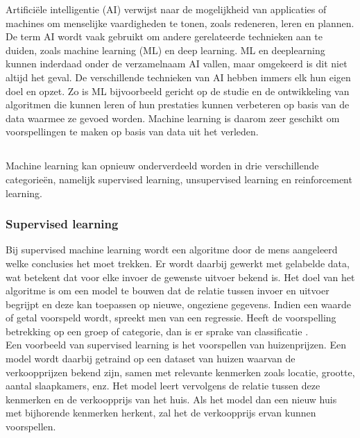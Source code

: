 Artificiële intelligentie (AI) verwijst naar de mogelijkheid van applicaties of machines om menselijke vaardigheden te tonen, zoals redeneren, leren en plannen. De term AI wordt vaak gebruikt om andere gerelateerde technieken aan te duiden, zoals machine learning (ML) en deep learning. ML en deeplearning kunnen inderdaad onder de verzamelnaam AI vallen, maar omgekeerd is dit niet altijd het geval. De verschillende technieken van AI hebben immers elk hun eigen doel en opzet. Zo is ML bijvoorbeeld gericht op de studie en de ontwikkeling van algoritmen die kunnen leren of hun prestaties kunnen verbeteren op basis van de data waarmee ze gevoed worden. Machine learning is daarom zeer geschikt om voorspellingen te maken op basis van data uit het verleden. \\

\subsection{}%
\label{sec:machine learning}

Machine learning kan opnieuw onderverdeeld worden in drie verschillende categorieën, namelijk supervised learning, unsupervised learning en reinforcement learning. 

\subsubsection{Supervised learning}

Bij supervised machine learning wordt een algoritme door de mens aangeleerd welke conclusies het moet trekken. Er wordt daarbij gewerkt met gelabelde data, wat betekent dat voor elke invoer de gewenste uitvoer bekend is. Het doel van het algoritme is om een model te bouwen dat de relatie tussen invoer en uitvoer begrijpt en deze kan toepassen op nieuwe, ongeziene gegevens. Indien een waarde of getal voorspeld wordt, spreekt men van een regressie. Heeft de voorspelling betrekking op een groep of categorie, dan is er sprake van classificatie \autocite{Brownlee2023}. \\

Een voorbeeld van supervised learning is het voorspellen van huizenprijzen. Een model wordt daarbij getraind op een dataset van huizen waarvan de verkoopprijzen bekend zijn, samen met relevante kenmerken zoals locatie, grootte, aantal slaapkamers, enz. Het model leert vervolgens de relatie tussen deze kenmerken en de verkoopprijs van het huis. Als het model dan een nieuw huis met bijhorende kenmerken herkent, zal het de verkoopprijs ervan kunnen voorspellen.

